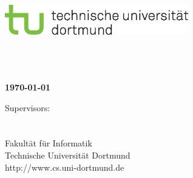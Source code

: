 \thispagestyle{empty}
\begin{titlepage}
\vspace*{-2cm}
\newlength{\links}
\setlength{\links}{-0.5cm} \sf \LARGE



\hspace*{\links}
\begin{minipage}{12.5cm}
\includegraphics[width=8cm]{coverpage/tud_logo_cmyk}
\end{minipage}

\vspace*{4cm}

\hspace*{\links}
\hspace*{-0.2cm}
\begin{minipage}{9cm}
\large
\begin{center}
\bf{\Titel} \\
\vspace*{1cm}
{\small \Untertitel} \\
\vspace*{1.5cm}
\Autor\\
\today
\end{center}
\end{minipage}



\vfill

\hspace*{\links}
\begin{minipage}[b]{15cm}
\normalsize
\raggedright
%
\vspace*{2.5cm}
%
\normalsize \raggedright
Supervisors: \\
\Supervisor \\
\otherSupervisor \\
\vspace*{1.5cm}
\textcolor{TUGreen}{Fakultät für Informatik\\
Technische Universität Dortmund \\
http://www.cs.uni-dortmund.de}
\end{minipage}


\end{titlepage}
